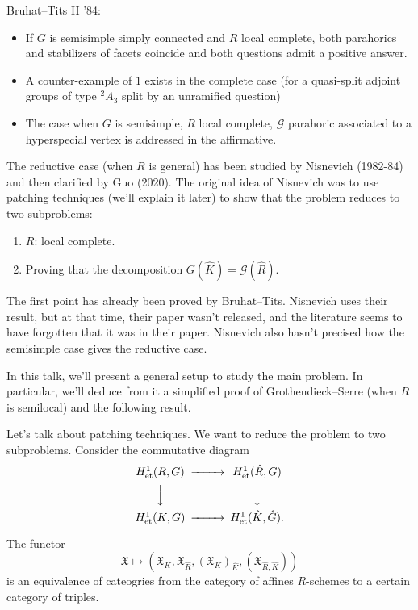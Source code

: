 \documentclass[reqno]{amsart} 
\numberwithin{theorem}{section}
\numberwithin{equation}{section}
\begin{document}
Bruhat--Tits II '84:
\begin{itemize}
\item If $G$ is semisimple simply connected and $R$ local complete, both parahorics and stabilizers of facets coincide and both questions admit a positive answer.
\item A counter-example of $1$ exists in the complete case (for a quasi-split adjoint groups of type ${}^2 A_3$ split by an unramified question)
\item The case when $G$ is semisimple, $R$ local complete, $\mathcal{G}$ parahoric associated to a hyperspecial vertex is addressed in the affirmative.
\end{itemize}
The reductive case (when $R$ is general) has been studied by Nisnevich (1982-84) and then clarified by Guo (2020).  The original idea of Nisnevich was to use patching techniques (we'll explain it later) to show that the problem reduces to two subproblems:
\begin{enumerate}
\item $R$: local complete.
\item Proving that the decomposition $G(\hat{K}) = \mathcal{G}(\hat{R})$.
\end{enumerate}
The first point has already been proved by Bruhat--Tits.  Nisnevich uses their result, but at that time, their paper wasn't released, and the literature seems to have forgotten that it was in their paper.  Nisnevich also hasn't precised how the semisimple case gives the reductive case.

In this talk, we'll present a general setup to study the main problem.  In particular, we'll deduce from it a simplified proof of Grothendieck--Serre (when $R$ is semilocal) and the following result.

Let's talk about patching techniques.  We want to reduce the problem to two subproblems.  Consider the commutative diagram
\begin{equation*}
  \begin{CD}         
    H^1_{\et}(R, G)    @>>> H^1_{\et}(\hat{R}, G)\\
    @VVV  @VVV \\
    H^1_{\et}(K, G)    @>>> H^1_{\et}(\hat{K}, \hat{G}).\\
  \end{CD}
\end{equation*}

\begin{theorem}
  The functor
  \begin{equation*}
    \mathfrak{X} \mapsto(\mathfrak{X}_K, \mathfrak{X}_{\hat{R}},(\mathfrak{X}_K)_{\hat{K}},(\mathfrak{X}_{\hat{R}, \hat{K}}))
  \end{equation*}
  is an equivalence of cateogries from the category of affines $R$-schemes to a certain category of triples.
\end{theorem}
\end{document}
